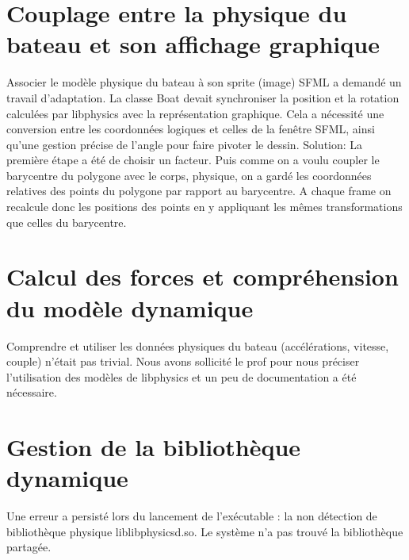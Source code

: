 \documentclass[a4paper,margin=1cm,11pt]{report}
\begin{document}
\section{Couplage entre la physique du bateau et son affichage graphique}
Associer le modèle physique du bateau à son sprite (image) SFML a demandé un travail d’adaptation. La classe Boat devait synchroniser la position et la rotation calculées par libphysics avec la représentation graphique. Cela a nécessité une conversion entre les coordonnées logiques et celles de la fenêtre SFML, ainsi qu'une gestion précise de l’angle pour faire pivoter le dessin.
Solution:
La première étape a été de choisir un facteur.
Puis comme on a voulu coupler le barycentre du polygone avec le corps, physique, on a gardé les coordonnées relatives des points du polygone par rapport au barycentre.
A chaque frame on recalcule donc les positions des points en y appliquant les mêmes transformations que celles du barycentre.

\section{Calcul des forces et compréhension du modèle dynamique}
Comprendre et utiliser les données physiques du bateau (accélérations, vitesse, couple) n'était pas trivial. Nous avons sollicité le prof pour nous préciser l’utilisation des modèles de libphysics et un peu de documentation a été nécessaire.

\section{Gestion de la bibliothèque dynamique}
Une erreur a persisté lors du lancement de l'exécutable : la non détection de bibliothèque physique liblibphysicsd.so. Le système n’a pas trouvé la bibliothèque partagée.
\end{document}

